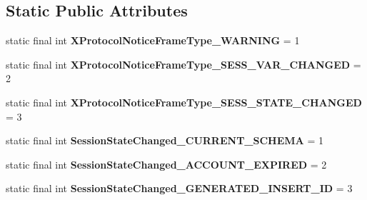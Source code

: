 \subsection*{Static Public Attributes}
\begin{DoxyCompactItemize}
\item 
\mbox{\label{classcom_1_1mysql_1_1cj_1_1protocol_1_1x_1_1_notice_a9b6f1846f75fe7b30c9f3d976a3036fd}} 
static final int {\bfseries X\+Protocol\+Notice\+Frame\+Type\+\_\+\+W\+A\+R\+N\+I\+NG} = 1
\item 
\mbox{\label{classcom_1_1mysql_1_1cj_1_1protocol_1_1x_1_1_notice_af74c4f7e379a384b60419a5da0dc6078}} 
static final int {\bfseries X\+Protocol\+Notice\+Frame\+Type\+\_\+\+S\+E\+S\+S\+\_\+\+V\+A\+R\+\_\+\+C\+H\+A\+N\+G\+ED} = 2
\item 
\mbox{\label{classcom_1_1mysql_1_1cj_1_1protocol_1_1x_1_1_notice_abd827c545c711230257c652ac3375418}} 
static final int {\bfseries X\+Protocol\+Notice\+Frame\+Type\+\_\+\+S\+E\+S\+S\+\_\+\+S\+T\+A\+T\+E\+\_\+\+C\+H\+A\+N\+G\+ED} = 3
\item 
\mbox{\label{classcom_1_1mysql_1_1cj_1_1protocol_1_1x_1_1_notice_aa59340b235c08a629497d9ce4b23f66e}} 
static final int {\bfseries Session\+State\+Changed\+\_\+\+C\+U\+R\+R\+E\+N\+T\+\_\+\+S\+C\+H\+E\+MA} = 1
\item 
\mbox{\label{classcom_1_1mysql_1_1cj_1_1protocol_1_1x_1_1_notice_a04e6d78fdca76927f17e2d8ba6ee79e8}} 
static final int {\bfseries Session\+State\+Changed\+\_\+\+A\+C\+C\+O\+U\+N\+T\+\_\+\+E\+X\+P\+I\+R\+ED} = 2
\item 
\mbox{\label{classcom_1_1mysql_1_1cj_1_1protocol_1_1x_1_1_notice_a40da7f7f7338b89708dcdf9fac31d110}} 
static final int {\bfseries Session\+State\+Changed\+\_\+\+G\+E\+N\+E\+R\+A\+T\+E\+D\+\_\+\+I\+N\+S\+E\+R\+T\+\_\+\+ID} = 3
\item 
\mbox{\label{classcom_1_1mysql_1_1cj_1_1protocol_1_1x_1_1_notice_a09b465a9aece5ab24a03a519c4d41351}} 

\end{DoxyCompactItemize}
